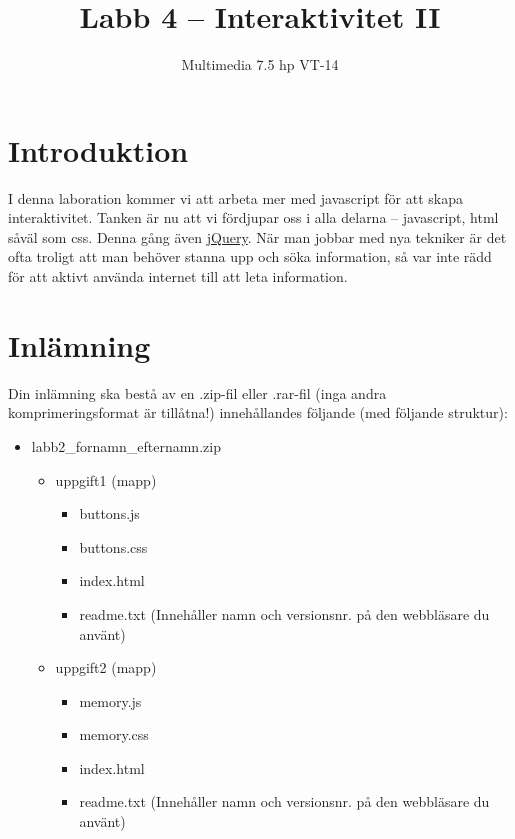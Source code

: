 \documentclass[12pt]{article}
\date{}
\title{ Labb 4 -- Interaktivitet II }
\author{ Multimedia 7.5 hp VT-14 }
\begin{document}
\maketitle
\vspace{-3.5em}



\section{Introduktion}
I denna laboration kommer vi att arbeta mer med javascript för att skapa interaktivitet. Tanken är nu att vi fördjupar oss i alla delarna -- javascript, html såväl som css. Denna gång även \href{http://jquery.com/}{jQuery}. När man jobbar med nya tekniker är det ofta troligt att man behöver stanna upp och söka information, så var inte rädd för att aktivt använda internet till att leta information.

\section{Inlämning}
Din inlämning ska bestå av en .zip-fil eller .rar-fil (inga andra komprimeringsformat är tillåtna!) innehållandes följande (med följande struktur):
  \begin{itemize}
    \item labb2\_fornamn\_efternamn.zip
      \vspace{-0.5em}
      \begin{itemize}
        \item uppgift1 (mapp)
          \begin{itemize}
            \item buttons.js
            \item buttons.css 
            \item index.html
            \item readme.txt (Innehåller namn och versionsnr. på den webbläsare du använt)
          \end{itemize}
	      \item uppgift2 (mapp)
          \begin{itemize}
            \item memory.js
            \item memory.css
            \item index.html
            \item readme.txt (Innehåller namn och versionsnr. på den webbläsare du använt)
          \end{itemize}
    \end{itemize}
  \end{itemize}
\end{document}
